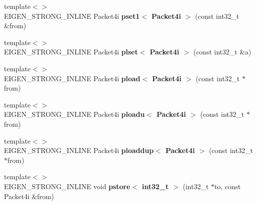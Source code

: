 \begin{DoxyCompactItemize}
\item 
\mbox{\label{namespace_eigen_1_1internal_a708be23132e1f16636c4bef6aac042f5}} 
{\footnotesize template$<$$>$ }\\E\+I\+G\+E\+N\+\_\+\+S\+T\+R\+O\+N\+G\+\_\+\+I\+N\+L\+I\+NE Packet4i {\bfseries pset1$<$ Packet4i $>$} (const int32\+\_\+t \&from)
\item 
\mbox{\label{namespace_eigen_1_1internal_adb3213470976ff627f38a34e3bde917b}} 
{\footnotesize template$<$$>$ }\\E\+I\+G\+E\+N\+\_\+\+S\+T\+R\+O\+N\+G\+\_\+\+I\+N\+L\+I\+NE Packet4i {\bfseries plset$<$ Packet4i $>$} (const int32\+\_\+t \&a)
\item 
\mbox{\label{namespace_eigen_1_1internal_a8d91e2398bb74bdc045b85fccf4e6ee6}} 
{\footnotesize template$<$$>$ }\\E\+I\+G\+E\+N\+\_\+\+S\+T\+R\+O\+N\+G\+\_\+\+I\+N\+L\+I\+NE Packet4i {\bfseries pload$<$ Packet4i $>$} (const int32\+\_\+t $\ast$from)
\item 
\mbox{\label{namespace_eigen_1_1internal_ac0a5eb98a74f70a8127424266cd1ee13}} 
{\footnotesize template$<$$>$ }\\E\+I\+G\+E\+N\+\_\+\+S\+T\+R\+O\+N\+G\+\_\+\+I\+N\+L\+I\+NE Packet4i {\bfseries ploadu$<$ Packet4i $>$} (const int32\+\_\+t $\ast$from)
\item 
\mbox{\label{namespace_eigen_1_1internal_af4d6d50f956ceffbb79f68fc11006ed4}} 
{\footnotesize template$<$$>$ }\\E\+I\+G\+E\+N\+\_\+\+S\+T\+R\+O\+N\+G\+\_\+\+I\+N\+L\+I\+NE Packet4i {\bfseries ploaddup$<$ Packet4i $>$} (const int32\+\_\+t $\ast$from)
\item 
\mbox{\label{namespace_eigen_1_1internal_ac0482dd42d73ee8735906cb2a4c27ee7}} 
{\footnotesize template$<$$>$ }\\E\+I\+G\+E\+N\+\_\+\+S\+T\+R\+O\+N\+G\+\_\+\+I\+N\+L\+I\+NE void {\bfseries pstore$<$ int32\+\_\+t $>$} (int32\+\_\+t $\ast$to, const Packet4i \&from)
\item 
\mbox{\label{namespace_eigen_1_1internal_ab0bf4d08a4768af5335b3b1e5dfd9711}} 

\end{DoxyCompactItemize}
